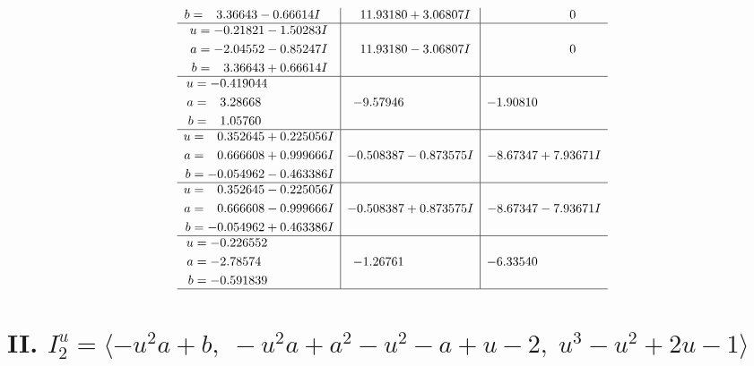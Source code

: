 \documentclass[1p]{elsarticle_modified}
\theoremstyle{definition}
\begin{document}
$$\begin{array}{c|c|c}
\begin{aligned}
b &= \phantom{-}3.36643 - 0.66614 I\end{aligned}
 & \phantom{-}11.93180 + 3.06807 I & \phantom{-0.000000 } 0 \\ \hline\begin{aligned}
u &= -0.21821 - 1.50283 I \\
a &= -2.04552 - 0.85247 I \\
b &= \phantom{-}3.36643 + 0.66614 I\end{aligned}
 & \phantom{-}11.93180 - 3.06807 I & \phantom{-0.000000 } 0 \\ \hline\begin{aligned}
u &= -0.419044\phantom{ +0.000000I} \\
a &= \phantom{-}3.28668\phantom{ +0.000000I} \\
b &= \phantom{-}1.05760\phantom{ +0.000000I}\end{aligned}
 & -9.57946\phantom{ +0.000000I} & -1.90810\phantom{ +0.000000I} \\ \hline\begin{aligned}
u &= \phantom{-}0.352645 + 0.225056 I \\
a &= \phantom{-}0.666608 + 0.999666 I \\
b &= -0.054962 - 0.463386 I\end{aligned}
 & -0.508387 - 0.873575 I & -8.67347 + 7.93671 I \\ \hline\begin{aligned}
u &= \phantom{-}0.352645 - 0.225056 I \\
a &= \phantom{-}0.666608 - 0.999666 I \\
b &= -0.054962 + 0.463386 I\end{aligned}
 & -0.508387 + 0.873575 I & -8.67347 - 7.93671 I \\ \hline\begin{aligned}
u &= -0.226552\phantom{ +0.000000I} \\
a &= -2.78574\phantom{ +0.000000I} \\
b &= -0.591839\phantom{ +0.000000I}\end{aligned}
 & -1.26761\phantom{ +0.000000I} & -6.33540\phantom{ +0.000000I}\\
 \hline 
 \end{array}$$\newpage\newpage\renewcommand{\arraystretch}{1}
\centering \section*{II. $I^u_{2}= \langle - u^2 a+b,\;- u^2 a+a^2- u^2- a+u-2,\;u^3- u^2+2 u-1 \rangle$}
\end{document}
